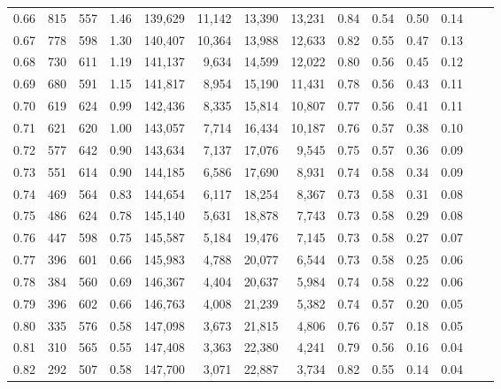 \begin{tabular}{rrrrrrrrrrrrrr}
0.66 &    815 &  557 &    1.46 &  139,629 &   11,142 &  13,390 &  13,231 &   0.84 &  0.54 &  0.50 &      0.14 \\
0.67 &    778 &  598 &    1.30 &  140,407 &   10,364 &  13,988 &  12,633 &   0.82 &  0.55 &  0.47 &      0.13 \\
0.68 &    730 &  611 &    1.19 &  141,137 &    9,634 &  14,599 &  12,022 &   0.80 &  0.56 &  0.45 &      0.12 \\
0.69 &    680 &  591 &    1.15 &  141,817 &    8,954 &  15,190 &  11,431 &   0.78 &  0.56 &  0.43 &      0.11 \\
0.70 &    619 &  624 &    0.99 &  142,436 &    8,335 &  15,814 &  10,807 &   0.77 &  0.56 &  0.41 &      0.11 \\
0.71 &    621 &  620 &    1.00 &  143,057 &    7,714 &  16,434 &  10,187 &   0.76 &  0.57 &  0.38 &      0.10 \\
0.72 &    577 &  642 &    0.90 &  143,634 &    7,137 &  17,076 &   9,545 &   0.75 &  0.57 &  0.36 &      0.09 \\
0.73 &    551 &  614 &    0.90 &  144,185 &    6,586 &  17,690 &   8,931 &   0.74 &  0.58 &  0.34 &      0.09 \\
0.74 &    469 &  564 &    0.83 &  144,654 &    6,117 &  18,254 &   8,367 &   0.73 &  0.58 &  0.31 &      0.08 \\
0.75 &    486 &  624 &    0.78 &  145,140 &    5,631 &  18,878 &   7,743 &   0.73 &  0.58 &  0.29 &      0.08 \\
0.76 &    447 &  598 &    0.75 &  145,587 &    5,184 &  19,476 &   7,145 &   0.73 &  0.58 &  0.27 &      0.07 \\
0.77 &    396 &  601 &    0.66 &  145,983 &    4,788 &  20,077 &   6,544 &   0.73 &  0.58 &  0.25 &      0.06 \\
0.78 &    384 &  560 &    0.69 &  146,367 &    4,404 &  20,637 &   5,984 &   0.74 &  0.58 &  0.22 &      0.06 \\
0.79 &    396 &  602 &    0.66 &  146,763 &    4,008 &  21,239 &   5,382 &   0.74 &  0.57 &  0.20 &      0.05 \\
0.80 &    335 &  576 &    0.58 &  147,098 &    3,673 &  21,815 &   4,806 &   0.76 &  0.57 &  0.18 &      0.05 \\
0.81 &    310 &  565 &    0.55 &  147,408 &    3,363 &  22,380 &   4,241 &   0.79 &  0.56 &  0.16 &      0.04 \\
0.82 &    292 &  507 &    0.58 &  147,700 &    3,071 &  22,887 &   3,734 &   0.82 &  0.55 &  0.14 &      0.04 \\

\end{tabular}
